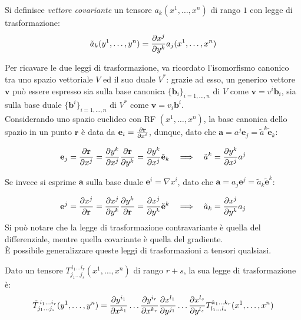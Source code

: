 \begin{definition}
	Si definisce \textit{vettore covariante} un tensore $ a_k (x^1, \dots, x^n) $ di rango $ 1 $ con legge di trasformazione:
	\begin{equation}
		\tilde{a}_k (y^1, \dots, y^n) = \frac{\partial x^j}{\partial y^k} a_j (x^1, \dots, x^n)
		\label{eq:5}
	\end{equation}
\end{definition}

Per ricavare le due leggi di trasformazione, va ricordato l'isomorfismo canonico tra uno spazio vettoriale $ V $ ed il suo duale $ V^* $: grazie ad esso, un generico vettore $ \mathbf{v} $ può essere espresso sia sulla base canonica $ \{\mathbf{b}_i\}_{i=1,\dots,n} $ di $ V $ come $ \mathbf{v} = v^i \mathbf{b}_i $, sia sulla base duale $ \{\mathbf{b}^i\}_{i=1,\dots,n} $ di $ V^* $ come $ \mathbf{v} = v_i \mathbf{b}^i $. \\ 
%
Considerando uno spazio euclideo con RF $ (x^1, \dots, x^n) $, la base canonica dello spazio in un punto $ \mathbf{r} $ è data da $ \mathbf{e}_i = \frac{\partial \mathbf{r}}{\partial x^i} $, dunque, dato che $ \mathbf{a} = a^j \mathbf{e}_j = \tilde{a}^k \tilde{\mathbf{e}}_k $:

\begin{equation}
	\mathbf{e}_j = \frac{\partial \mathbf{r}}{\partial x^j} = \frac{\partial y^k}{\partial x^j} \frac{\partial \mathbf{r}}{\partial y^k} = \frac{\partial y^k}{\partial x^j} \tilde{\mathbf{e}}_k \quad \Longrightarrow \quad \tilde{a}^k = \frac{\partial y^k}{\partial x^j} a^j
	\label{eq:6}
\end{equation}

Se invece si esprime $ \mathbf{a} $ sulla base duale $ \mathbf{e}^i = \nabla x^i $, dato che $ \mathbf{a} = a_j \mathbf{e}^j = \tilde{a}_k \tilde{\mathbf{e}}^k $:

\begin{equation}
	\mathbf{e}^j = \frac{\partial x^j}{\partial \mathbf{r}} = \frac{\partial x^j}{\partial y^k} \frac{\partial y^k} {\partial \mathbf{r}} = \frac{\partial x^j}{\partial y^k} \tilde{\mathbf{e}}^k \quad \Longrightarrow \quad \tilde{a}_k = \frac{\partial x^j}{\partial y^k} a_j
	\label{eq:7}
\end{equation}
Si può notare che la legge di trasformazione contravariante è quella del differenziale, mentre quella covariante è quella del gradiente. \\
%
È possibile generalizzare queste leggi di trasformazioni a tensori qualsiasi.

\begin{definition}
	Dato un tensore $ T^{\,i_1 \dots i_r}_{j_1 \dots j_s} (x^1, \dots, x^n) $ di rango $ r+s $, la sua legge di trasformazione è:
	\begin{equation}
		\tilde{T}^{\,i_1 \dots i_r}_{j_1 \dots j_s} (y^1, \dots, y^n) = \frac{\partial y^{i_1}}{\partial x^{k_1}} \dots \frac{\partial y^{i_r}}{\partial x^{k_r}} \frac{\partial x^{l_1}}{\partial y^{j_1}} \dots \frac{\partial x^{l_s}}{\partial y^{l_s}} T^{k_1 \dots k_r}_{l_1 \dots l_s} (x^1, \dots, x^n)
		\label{eq:8}
	\end{equation}
\end{definition}

